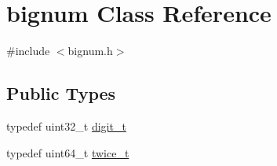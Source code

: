 \hypertarget{classyuh_1_1bignum}{\section{bignum \-Class \-Reference}
\label{d7/d6b/classyuh_1_1bignum}
}


{\ttfamily \#include $<$bignum.\-h$>$}

\subsection*{\-Public \-Types}
\begin{DoxyCompactItemize}
\item 
typedef uint32\-\_\-t \hyperlink{classyuh_1_1bignum_a918fd2d7b4fcfb6452272f1477745a53}{digit\-\_\-t}
\item 
typedef uint64\-\_\-t \hyperlink{classyuh_1_1bignum_ac439f7dc1f74e035e0543cc184a57445}{twice\-\_\-t}
\end{DoxyCompactItemize}
